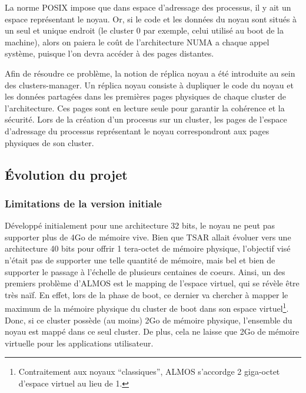       La norme POSIX impose que dans espace d'adressage des processus, il y ait
      un espace représentant le noyau. Or, si le code et les données du noyau
      sont situés à un seul et unique endroit (le cluster 0 par exemple, celui
      utilisé au boot de la machine), alors on paiera le coût de l'architecture
      NUMA a chaque appel système, puisque l'on devra accéder à des pages
      distantes.

      Afin de résoudre ce problème, la notion de réplica noyau a été introduite
      au sein des clusters-manager. Un réplica noyau consiste à dupliquer le
      code du noyau et les données partagées dans les premières pages physiques
      de chaque cluster de l'architecture. Ces pages sont en lecture seule pour
      garantir la cohérence et la sécurité. Lors de la création d'un procesus
      sur un cluster, les pages de l'espace d'adressage du processus
      représentant le noyau correspondront aux pages physiques de son cluster.


  \subsection{Évolution du projet}

    \subsubsection{Limitations de la version initiale}
    \label{subsec:unsolved}
    
      Développé initialement pour une architecture 32 bits, le noyau ne peut pas
      supporter plus de 4Go de mémoire vive. Bien que TSAR allait évoluer vers
      une architecture 40 bits pour offrir 1 tera-octet de mémoire physique,
      l'objectif visé n'était pas de supporter une telle quantité de mémoire,
      mais bel et bien de supporter le passage à l'échelle de plusieurs
      centaines de coeurs. Ainsi, un des premiers problème d'ALMOS est le
      mapping de l'espace virtuel, qui se révèle être très naïf. En effet, lors
      de la phase de boot, ce dernier va chercher à mapper le maximum de la
      mémoire physique du cluster de boot dans son espace
      virtuel\footnote{Contraitement aux noyaux ``classiques'', ALMOS s'accordge
        2 giga-octet d'espace virtuel au lieu de 1.}. Donc, si ce cluster
      possède (au moins) 2Go de mémoire physique, l'ensemble du noyau est mappé
      dans ce seul cluster. De plus, cela ne laisse que 2Go de mémoire virtuelle
      pour les applications utilisateur.

